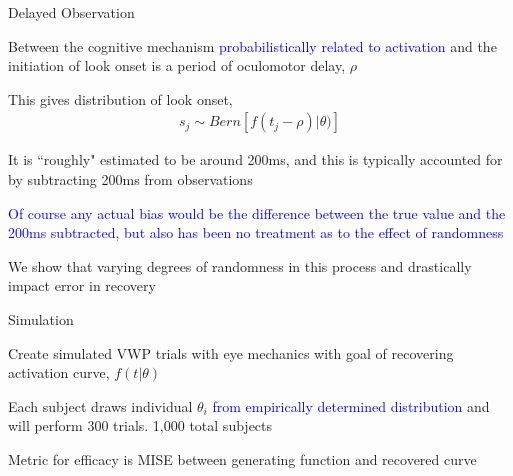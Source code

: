\documentclass{beamer}
\newcommand{\vp}{\vspace{2mm}}
\providecommand{\cn}[1]{\textcolor{blue}{#1}}
\begin{document}
\begin{frame}{Delayed Observation}\large

Between the cognitive mechanism \cn{probabilistically related to activation} and the initiation of look onset is a period of oculomotor delay, $\rho$ \vp

This gives distribution of look onset,
\vspace{-1mm}
\begin{align*}
s_j \sim Bern \left[f(t_j - \rho) | \theta)\right]
\end{align*}

It is ``roughly" estimated to be around 200ms, and this is typically accounted for by subtracting 200ms from observations \vp

\cn{Of course any actual bias would be the difference between the true value and the 200ms subtracted, but also has been no treatment as to the effect of randomness} \vp

We show that varying degrees of randomness in this process and drastically impact error in recovery

\end{frame}
%
%
%
%
%
%

\begin{frame}{Simulation}\Large

Create simulated VWP trials with eye mechanics with goal of recovering activation curve, $f(t|\theta)$ \vp \vp

Each subject draws individual $\theta_i$ \cn{from empirically determined distribution} and will perform 300 trials. 1,000 total subjects \vp \vp

Metric for efficacy is MISE between generating function and recovered curve
\end{frame}
\end{document}
